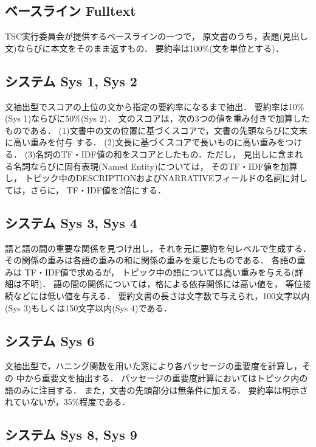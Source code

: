 \subsection{ベースライン Fulltext}
TSC実行委員会が提供するベースラインの一つで，
原文書のうち，表題(見出し文)ならびに本文をそのまま返すもの．
要約率は100\%(文を単位とする)．


\subsection{システム Sys 1, Sys 2} 
文抽出型でスコアの上位の文から指定の要約率になるまで抽出．
要約率は10\%(Sys 1)ならびに50\%(Sys 2)．
文のスコアは，次の3つの値を重み付きで加算したものである．
(1)文書中の文の位置に基づくスコアで，文書の先頭ならびに文末に高い重みを付与
する．
(2)文長に基づくスコアで長いものに高い重みをつける．
(3)名詞のTF・IDF値の和をスコアとしたもの．ただし，
   見出しに含まれる名詞ならびに固有表現(Named Entity)については，
   そのTF・IDF値を加算し，
   トピック中のDESCRIPTIONおよびNARRATIVEフィールドの名詞に対しては，さらに，
   TF・IDF値を2倍にする．

\subsection{システム Sys 3, Sys 4} 

語と語の間の重要な関係を見つけ出し，それを元に要約を句レベルで生成する．
その関係の重みは各語の重みの和に関係の重みを乗じたものである．
各語の重みは TF・IDF値で求めるが，
トピック中の語については高い重みを与える(詳細は不明)．
語の間の関係については，格による依存関係には高い値を，
等位接続などには低い値を与える．
要約文書の長さは文字数で与えられ，100文字以内(Sys 3)もしくは150文字以内(Sys 4)である．

\subsection{システム Sys 6} 
文抽出型で，ハニング関数を用いた窓により各パッセージの重要度を計算し，その	中から重要文を抽出する．
パッセージの重要度計算においてはトピック内の語のみに注目する．
また，文書の先頭部分は無条件に加える．
要約率は明示されていないが，35\%程度である．


\subsection{システム Sys 8, Sys 9}

